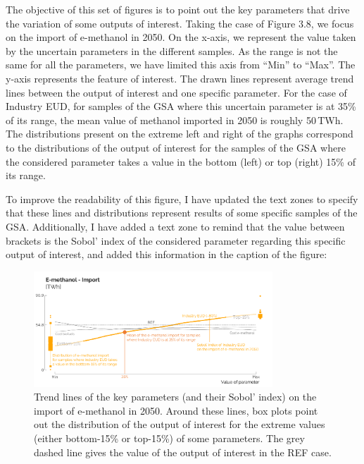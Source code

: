 \documentclass[12pt,a4paper]{article}
\begin{document}
\noindent The objective of this set of figures is to point out the key parameters that drive the variation of some outputs of interest. Taking the case of Figure 3.8, we focus on the import of e-methanol in 2050. On the x-axis, we represent the value taken by the uncertain parameters in the different samples. As the range is not the same for all the parameters, we have limited this axis from ``Min'' to ``Max''. The y-axis represents the feature of interest. The drawn lines represent average trend lines between the output of interest and one specific parameter. For the case of Industry EUD, for samples of the GSA where this uncertain parameter is at 35\% of its range, the mean value of methanol imported in 2050 is roughly 50\,TWh. The distributions present on the extreme left and right of the graphs correspond to the distributions of the output of interest for the samples of the GSA where the considered parameter takes a value in the bottom (left) or top (right) 15\% of its range. 

To improve the readability of this figure, I have updated the text zones to specify that these lines and distributions represent results of some specific samples of the GSA. Additionally, I have added a text zone to remind that the value between brackets is the Sobol' index of the considered parameter regarding this specific output of interest, and added this information in the caption of the figure:

\begin{figure}[htbp!]
\centering
\includegraphics[width=0.8\textwidth]{UQ_Methanol_samples_2.pdf}
\caption{Trend lines of the key parameters (and their Sobol' index) on the import of e-methanol in 2050. Around these lines, box plots point out the distribution of the output of interest for the extreme values (either bottom-15\% or top-15\%) of some parameters. The grey dashed line gives the value of the output of interest in the REF case. }
\label{fig:results_uq_samples_methanol}
\end{figure}
\end{document}
